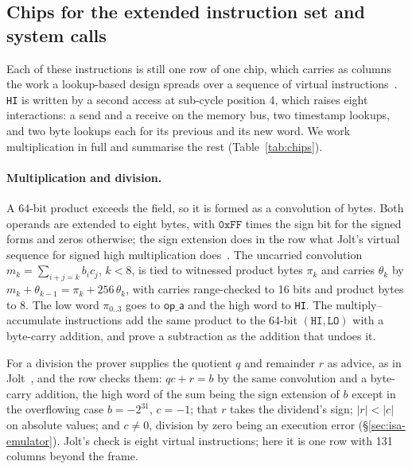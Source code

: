 \subsection{Chips for the extended instruction set and system calls}
\label{sec:ext}

Each of these instructions is still one row of one chip, which carries as columns the work a lookup-based design spreads over a sequence of virtual instructions~\citep{jolt}. \texttt{HI} is written by a second access at sub-cycle position 4, which raises eight interactions: a send and a receive on the memory bus, two timestamp lookups, and two byte lookups each for its previous and its new word. We work multiplication in full and summarise the rest (Table~\ref{tab:chips}).

\paragraph{Multiplication and division.}\label{sec:ext-mul}\label{sec:ext-div} A 64-bit product exceeds the field, so it is formed as a convolution of bytes. Both operands are extended to eight bytes, with $\mathtt{0xFF}$ times the sign bit for the signed forms and zeros otherwise; the sign extension does in the row what Jolt's virtual sequence for signed high multiplication does~\citep{jolt}. The uncarried convolution $m_k = \sum_{i+j=k} b_i c_j$, $k < 8$, is tied to witnessed product bytes $\pi_k$ and carries $\theta_k$ by $m_k + \theta_{k-1} = \pi_k + 256\,\theta_k$, with carries range-checked to 16 bits and product bytes to 8. The low word $\pi_{0..3}$ goes to $\mathsf{op\_a}$ and the high word to \texttt{HI}. The multiply--accumulate instructions add the same product to the 64-bit $(\texttt{HI}, \texttt{LO})$ with a byte-carry addition, and prove a subtraction as the addition that undoes it.

For a division the prover supplies the quotient $q$ and remainder $r$ as advice, as in Jolt~\citep{jolt}, and the row checks them: $qc + r = b$ by the same convolution and a byte-carry addition, the high word of the sum being the sign extension of $b$ except in the overflowing case $b = -2^{31}$, $c = -1$; that $r$ takes the dividend's sign; $|r| < |c|$ on absolute values; and $c \neq 0$, division by zero being an execution error (\S\ref{sec:isa-emulator}). Jolt's check is eight virtual instructions; here it is one row with 131 columns beyond the frame.

